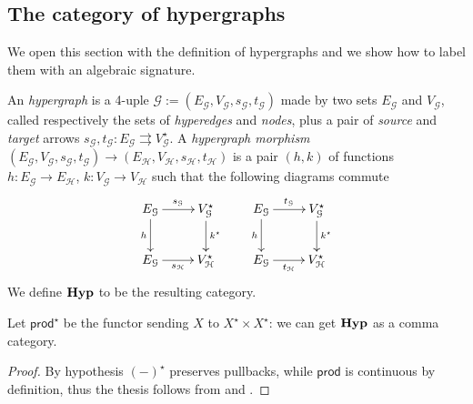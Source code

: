\documentclass[a4paper,UKenglish,cleveref,pdftex,thm-restate,numberwithinsect]{lipics-v2021}
\newcommand{\lgh}{\mathsf{lg}}
\newcommand{\Set}{\mathbf{Set}}
\def\X{\textbf {\textup{X}}}
\newcommand{\catname}[1]{\textbf{\textup{#1}}}
\newcommand{\hyp}{\catname{Hyp}}
\newcommand{\pro}{\mathsf{prod}}
\newcommand{\comma}[2]{#1\hspace{1pt} {\downarrow}#2}
\newcommand{\id}[1]{\mathsf{id}_{#1}}
\begin{document}

\subsection{The category of hypergraphs}

We open this section with the definition of hypergraphs and we show how to label them with an algebraic signature.  


\begin{definition}An \emph{hypergraph} is a 4-uple $\mathcal{G}:=(E_\mathcal{G}, V_\mathcal{G}, s_\mathcal{G}, t_\mathcal{G})$ made by two sets $E_\mathcal{G}$ and $V_\mathcal{G}$, called respectively the sets of \emph{hyperedges} and \emph{nodes}, plus a pair of \emph{source} and \emph{target} arrows  $s_\mathcal{G}, t_\mathcal{G}\colon E_\mathcal{G}\rightrightarrows V_\mathcal{G}^\star$. A \emph{hypergraph morphism} $(E_\mathcal{G}, V_\mathcal{G}, s_\mathcal{G}, t_\mathcal{G})\to (E_\mathcal{H}, V_\mathcal{H}, s_\mathcal{H}, t_\mathcal{H})$ is a pair $(h,k)$ of functions $h\colon E_\mathcal{G}\to E_\mathcal{H}$, $k\colon V_\mathcal{G}\to V_\mathcal{H}$ such that the following diagrams commute
	\[\xymatrix{ E_{\mathcal{G}} \ar[d]_{h} \ar[r]^{s_{\mathcal{G}}}& V^\star_{\mathcal{G}}  \ar[d]^{k^\star}& E_{\mathcal{G}} \ar[r]^{t_{\mathcal{G}}} \ar[d]_{h} & V^\star_{\mathcal{G}} \ar[d]^{k^\star}  \\ E_{\mathcal{G}} \ar[r]_{s_{\mathcal{H}}} & V^\star_{\mathcal{H}} & E_{\mathcal{G}} \ar[r]_{t_{\mathcal{H}}} & V^\star_{\mathcal{H}} }\]
	We define $\hyp$ to be the resulting category.
\end{definition}

Let $\pro^\star$ be the functor sending $X$ to $X^\star\times X^\star$: we can get $\hyp$ as a comma category.


\begin{proof}
	By hypothesis $(-)^\star$ preserves pullbacks, while $\pro$ is continuous by definition, thus the thesis follows from   and .   
\end{proof}
\end{document}

